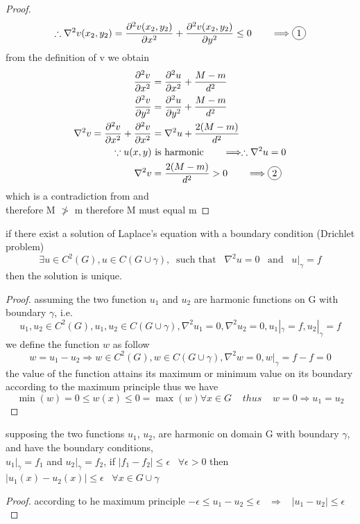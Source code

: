 \documentclass[]{article}
\begin{document}
\begin{proof}
\[    \]
    \[
        \therefore  \nabla^2 v(x_2,y_2) =  \frac{\partial^2 v(x_2,y_2)}{\partial x^2}+\frac{\partial^2 v(x_2,y_2)}{\partial y^2} \leq 0 \dquad \Longrightarrow \circled{1}
    \]
    from the definition of v we obtain
    \begin{align*}
        \frac{\partial^2 v}{\partial x^2} &= \frac{\partial^2 u}{\partial x^2} + \frac{M-m}{d^2}
        \\
        \frac{\partial^2 v}{\partial y^2} &= \frac{\partial^2 u}{\partial y^2} + \frac{M-m}{d^2}
        \\
        \nabla^2 v = \frac{\partial^2 v}{\partial x^2} + \frac{\partial^2 v}{\partial x^2} &= \nabla^2 u + \frac{2(M-m)}{d^2}
        \\
        \because u(x,y) &\text{ is harmonic}\dquad \Longrightarrow \therefore \nabla^2 u = 0
        \\
        \nabla^2 v &= \frac{2(M-m)}{d^2} > 0 \dquad \Longrightarrow \circled{2}
    \end{align*}
    which is a contradiction from  and  
    \\
    therefore M $\ngtr$ m therefore M must equal m 
\end{proof}
\begin{theorem}
    if there exist a solution of Laplace's equation 
    with a boundary condition (Drichlet problem)
    \[
    \exists u \in C^2(G), u \in C(G \cup \gamma),\;\; \text{such that} \;\;\; \nabla^2 u =0 \;\;\; \text{and} \;\;\; u|_\gamma = f
    \]
    then the solution is unique.
\end{theorem}
\begin{proof}
assuming the two function $u_1$ and $u_2$ are harmonic functions on G with boundary $\gamma$, i.e. 
\[
    u_1 ,u_2 \in C^2(G), u_1 , u_2 \in C(G \cup \gamma), \nabla^2 u_1 =0, \nabla^2 u_2 =0, u_1|_\gamma = f, u_2|_\gamma = f    
\]
we define the function $w$ as follow
\[
    w = u_1-u_2 \Rightarrow w\in C^2(G), w \in C(G \cup \gamma), \nabla^2 w =0, w|_\gamma = f-f = 0    
\]
the value of the function attains its maximum or minimum value on its boundary according to the maximum principle thus we have
\[
    \min(w) = 0 \leq w(x) \leq 0= \max(w) \forall x \in G \;\;\;\; thus \;\;\;\; w = 0 \Rightarrow u_1 = u_2     
\]
\end{proof}

\begin{theorem}
    supposing the two functions $u_1$, $u_2$, are harmonic on domain G with boundary $\gamma$, and have the boundary conditions, 
    \\
    $u_1|_\gamma = f_1$ and $u_2|_\gamma = f_2$, if $|f_1 - f_2| \leq \epsilon  \;\;\; \forall \epsilon > 0$ then $|u_1(x) - u_2(x)| \leq \epsilon \;\;\; \forall x \in G \cup \gamma $
\end{theorem}
\begin{proof}
    according to he maximum principle $-\epsilon \leq u_1 - u_2 \leq \epsilon \;\;\; \Rightarrow \;\;\; |u_1 - u_2| \leq \epsilon$
\end{proof}
\end{document}
